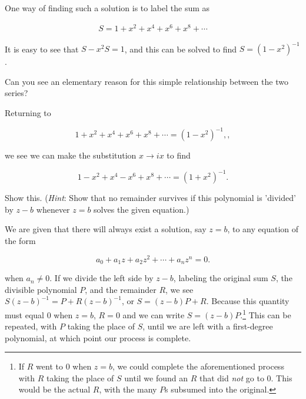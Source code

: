 \documentclass[../the-road-to-reality.tex]{subfiles}
\begin{document}
\begin{questions}
\begin{solution}
	One way of finding such a solution is to label the sum as
	
	\begin{align*}
		S = 1 + x^2 + x^4 + x^6 + x^8 + \cdots
	\end{align*}

	It is easy to see that $S - x^2S = 1$, and this can be solved to find $S = (1 - x^2)^{-1}$.
\end{solution}

\question Can you see an elementary reason for this simple relationship between the two series?

\begin{solution}
	Returning to

	\[
	1 + x^2 + x^4 + x^6 + x^8 + \cdots = (1 - x^2)^{-1},
	,\]
	
	we see we can make the substitution $x \to ix$ to find

	\[
	1 - x^2 + x^4 - x^6 + x^8 + \cdots = (1 + x^2)^{-1}
	.\] 
\end{solution}

\question Show this. (\textit{Hint}: Show that no remainder survives if this polynomial is 'divided' by $z - b$ whenever $z = b$ solves the given equation.)

\begin{solution}
	We are given that there will always exist a solution, say $z = b$, to any equation of the form
	
	\[
	a_0 + a_1z + a_2z^2 + \cdots + a_nz^n = 0
	.\] 
		
	when $a_n \neq 0$. If we divide the left side by $z - b$, labeling the original sum $S$, the divisible polynomial $P$, and the remainder $R$, we see $S(z-b)^{-1} = P + R(z-b)^{-1}$, or $S = (z-b)P + R$. Because this quantity must equal $0$ when $z = b$, $R = 0$ and we can write $S = (z-b)P$.\footnote{If $R$ went to $0$ when $z = b$, we could complete the aforementioned process with $R$ taking the place of $S$ until we found an $R$ that did \textit{not} go to $0$. This would be the actual $R$, with the many $P$s subsumed into the original.} This can be repeated, with $P$ taking the place of $S$, until we are left with a first-degree polynomial, at which point our process is complete.
\end{solution}

\end{questions}
	
\end{document}
